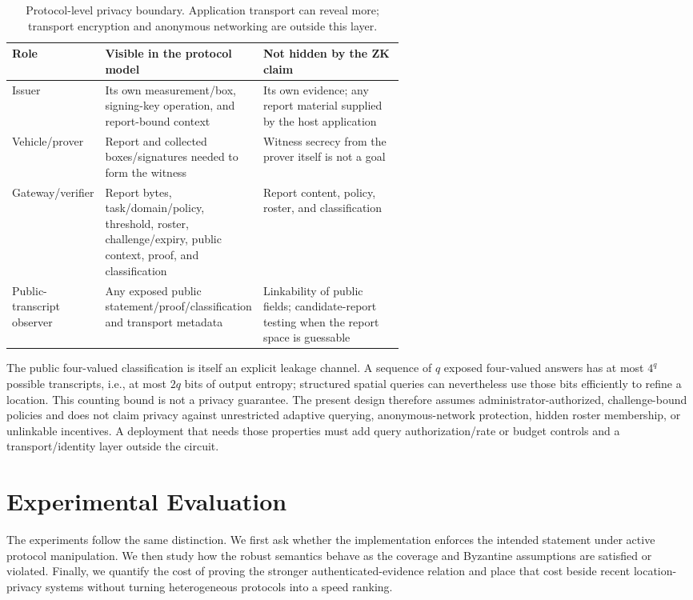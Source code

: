 \documentclass[preprint,review,12pt]{elsarticle}
\begin{document}
\begin{table}[htbp]
\centering\footnotesize
\caption{Protocol-level privacy boundary. Application transport can reveal more; transport encryption and anonymous networking are outside this layer.}\label{tab:privacy-boundary}
\begin{tabularx}{\linewidth}{@{}>{\raggedright\arraybackslash}p{0.19\linewidth}>{\raggedright\arraybackslash}p{0.38\linewidth}>{\raggedright\arraybackslash}X@{}}
\toprule
Role & Visible in the protocol model & Not hidden by the ZK claim\\
\midrule
Issuer & Its own measurement/box, signing-key operation, and report-bound context & Its own evidence; any report material supplied by the host application\\
Vehicle/prover & Report and collected boxes/signatures needed to form the witness & Witness secrecy from the prover itself is not a goal\\
Gateway/verifier & Report bytes, task/domain/policy, threshold, roster, challenge/expiry, public context, proof, and classification & Report content, policy, roster, and classification\\
Public-transcript observer & Any exposed public statement/proof/classification and transport metadata & Linkability of public fields; candidate-report testing when the report space is guessable\\
\bottomrule
\end{tabularx}
\end{table}

The public four-valued classification is itself an explicit leakage channel. A sequence of $q$ exposed four-valued answers has at most $4^q$ possible transcripts, i.e., at most $2q$ bits of output entropy; structured spatial queries can nevertheless use those bits efficiently to refine a location. This counting bound is not a privacy guarantee. The present design therefore assumes administrator-authorized, challenge-bound policies and does not claim privacy against unrestricted adaptive querying, anonymous-network protection, hidden roster membership, or unlinkable incentives. A deployment that needs those properties must add query authorization/rate or budget controls and a transport/identity layer outside the circuit.
\section{Experimental Evaluation}
The experiments follow the same distinction. We first ask whether the implementation enforces the intended statement under active protocol manipulation. We then study how the robust semantics behave as the coverage and Byzantine assumptions are satisfied or violated. Finally, we quantify the cost of proving the stronger authenticated-evidence relation and place that cost beside recent location-privacy systems without turning heterogeneous protocols into a speed ranking.
\end{document}
